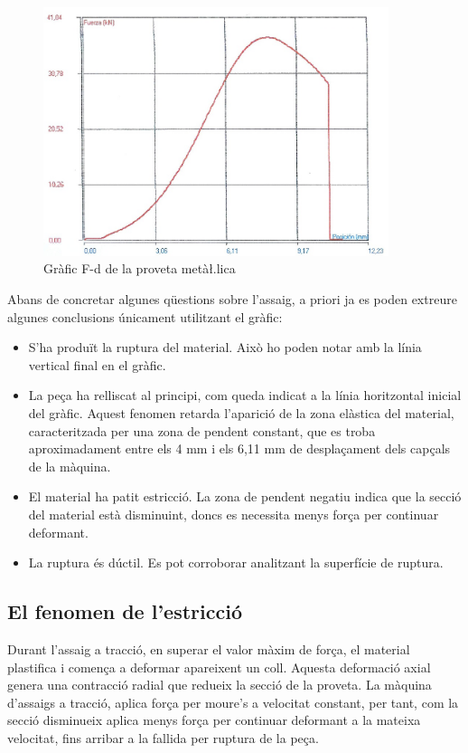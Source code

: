 \documentclass[a4paper]{report}
\begin{document}
\begin{figure}[hb]
    \centering
    \includegraphics[width=0.9\textwidth]{images/traccio/metalica-grafic-proveta}
    \caption{Gràfic F-d de la proveta metà\l.lica}
    \label{fig:traccio-metalica-grafic-proveta}
\end{figure}

Abans de concretar algunes qüestions sobre l'assaig, a priori ja es poden extreure algunes conclusions únicament utilitzant el gràfic:
\begin{itemize}
    \item  S'ha produït la ruptura del material. Això ho poden notar amb la línia vertical final en el gràfic.
    \item  La peça ha relliscat al principi, com queda indicat a la línia horitzontal inicial del gràfic. Aquest fenomen retarda l'aparició de la zona elàstica del material, caracteritzada per una zona de pendent constant, que es troba aproximadament entre els 4 mm i els 6,11 mm de desplaçament dels capçals de la màquina.
    \item  El material ha patit estricció. La zona de pendent negatiu indica que la secció del material està disminuint, doncs es necessita menys força per continuar deformant.
    \item  La ruptura és dúctil. Es pot corroborar analitzant la superfície de ruptura.
\end{itemize}

\subsection{El fenomen de l'estricció}

Durant l'assaig a tracció, en superar el valor màxim de força, el material plastifica i comença a deformar apareixent un coll. Aquesta deformació axial genera una contracció radial que redueix la secció de la proveta. La màquina d'assaigs a tracció, aplica força per moure's a velocitat constant, per tant, com la secció disminueix aplica menys força per continuar deformant a la mateixa velocitat, fins arribar a la fallida per ruptura de la peça.
\end{document}
